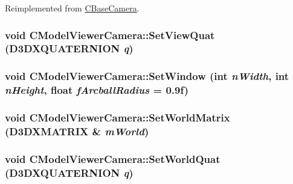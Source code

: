 Reimplemented from \hyperlink{class_c_base_camera_a17b45dd3b6055bc761058d57f5a10c02}{CBaseCamera}.\hypertarget{class_c_model_viewer_camera_a66a842563bb9078bfa641bf6f1190818}{
\subsubsection[{SetViewQuat}]{\setlength{\rightskip}{0pt plus 5cm}void CModelViewerCamera::SetViewQuat (D3DXQUATERNION {\em q})}}
\label{class_c_model_viewer_camera_a66a842563bb9078bfa641bf6f1190818}
\hypertarget{class_c_model_viewer_camera_aa3602c760615115aa606cc3dfe9675fc}{
\subsubsection[{SetWindow}]{\setlength{\rightskip}{0pt plus 5cm}void CModelViewerCamera::SetWindow ({\bf int} {\em nWidth}, \/  {\bf int} {\em nHeight}, \/  float {\em fArcballRadius} = {\ttfamily 0.9f})}}
\label{class_c_model_viewer_camera_aa3602c760615115aa606cc3dfe9675fc}
\hypertarget{class_c_model_viewer_camera_ab5316accb7dfb3fd30a98f2647cedca0}{
\subsubsection[{SetWorldMatrix}]{\setlength{\rightskip}{0pt plus 5cm}void CModelViewerCamera::SetWorldMatrix (D3DXMATRIX \& {\em mWorld})}}
\label{class_c_model_viewer_camera_ab5316accb7dfb3fd30a98f2647cedca0}
\hypertarget{class_c_model_viewer_camera_a48515af5127c1647621df308171d72d4}{
\subsubsection[{SetWorldQuat}]{\setlength{\rightskip}{0pt plus 5cm}void CModelViewerCamera::SetWorldQuat (D3DXQUATERNION {\em q})}}
\label{class_c_model_viewer_camera_a48515af5127c1647621df308171d72d4}


